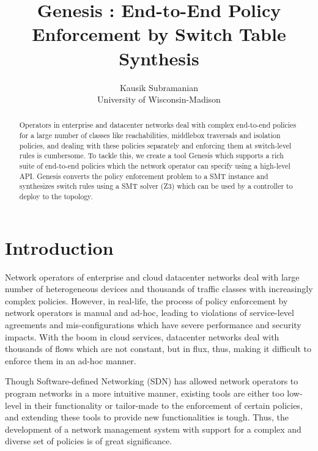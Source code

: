 \documentclass[]{sig}
\title{Genesis : End-to-End Policy Enforcement by Switch Table Synthesis }
\author{Kausik Subramanian \\
	University of Wisconsin-Madison}
\begin{document}
\maketitle

\begin{abstract}
Operators in enterprise and datacenter networks deal with complex end-to-end policies for a large number of classes like reachabilities, middlebox traversals and isolation policies, and dealing with these policies separately and enforcing them at switch-level rules is cumbersome. To tackle this, we create a tool Genesis which supports a rich suite of end-to-end policies which the network operator can specify using a high-level API. Genesis converts the policy enforcement problem to a SMT instance and synthesizes switch rules using a SMT solver (Z3) which can be used by a controller to deploy to the topology.
\end{abstract}

\section{Introduction}
Network operators of enterprise and cloud datacenter networks deal with large number of heterogeneous devices and thousands of traffic classes with increasingly complex policies. However, in real-life, the process of policy enforcement by network operators is manual and ad-hoc, leading to violations of service-level agreements and mis-configurations which have severe performance and security impacts. With the boom in cloud services, datacenter networks deal with thousands of flows which are not constant, but in flux, thus, making it difficult to enforce them in an ad-hoc manner. 

Though Software-defined Networking (SDN) has allowed network operators to program networks in a more intuitive manner, existing tools are either too low-level in their functionality or tailor-made to the enforcement of certain policies, and extending these tools to provide new functionalities is tough. Thus, the development of a network management system with support for a complex and diverse set of policies is of great significance. 

\end{document}
